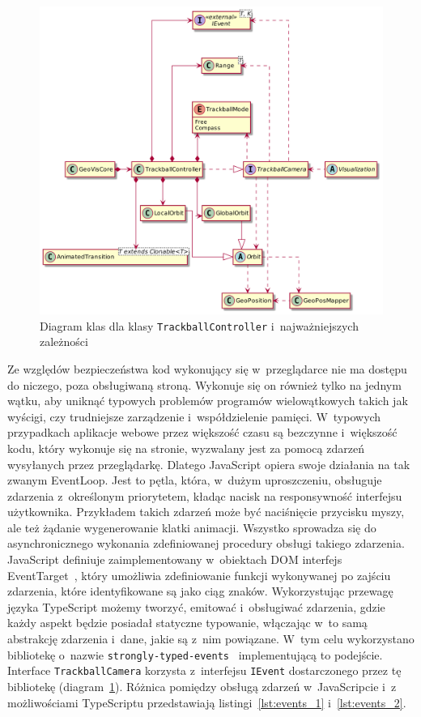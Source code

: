 \begin{figure}
    \centering
    \includegraphics[width=\linewidth]{diagrams/out/c3_trackball.png}
    \caption{Diagram klas dla klasy \texttt{TrackballController} i~najważniejszych zależności}
    \label{fig:c3_trackball}
\end{figure}

Ze względów bezpieczeństwa kod wykonujący się w~przeglądarce nie ma dostępu do niczego, poza obsługiwaną stroną. Wykonuje się on również tylko na jednym wątku, aby uniknąć typowych problemów programów wielowątkowych takich jak wyścigi, czy trudniejsze zarządzenie i~współdzielenie pamięci. W~typowych przypadkach aplikacje webowe przez większość czasu są bezczynne i~większość kodu, który wykonuje się na stronie, wyzwalany jest za pomocą zdarzeń wysyłanych przez przeglądarkę. Dlatego JavaScript opiera swoje działania na tak zwanym EventLoop. Jest to pętla, która, w~dużym uproszczeniu, obsługuje zdarzenia z~określonym priorytetem, kładąc nacisk na responsywność interfejsu użytkownika. Przykładem takich zdarzeń może być naciśnięcie przycisku myszy, ale też żądanie wygenerowanie klatki animacji. Wszystko sprowadza się do asynchronicznego wykonania zdefiniowanej procedury obsługi takiego zdarzenia. JavaScript definiuje zaimplementowany w~obiektach DOM interfejs EventTarget~\cite{JsEvents}, który umożliwia zdefiniowanie funkcji wykonywanej po zajściu zdarzenia, które identyfikowane są jako ciąg znaków. Wykorzystując przewagę języka TypeScript możemy tworzyć, emitować i~obsługiwać zdarzenia, gdzie każdy aspekt będzie posiadał statyczne typowanie, włączając w~to samą abstrakcję zdarzenia i~dane, jakie są z~nim powiązane. W~tym celu wykorzystano bibliotekę o~nazwie \texttt{strongly-typed-events}~\cite{Events} implementującą to podejście. Interface \texttt{TrackballCamera} korzysta z~interfejsu \texttt{IEvent} dostarczonego przez tę bibliotekę (diagram~\ref{fig:c3_trackball}). Różnica pomiędzy obsługą zdarzeń w~JavaScripcie i~z możliwościami TypeScriptu przedstawiają listingi~\ref{lst:events_1} i~\ref{lst:events_2}.

